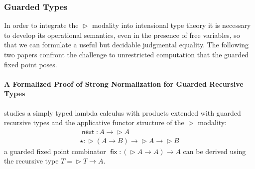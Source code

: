 \documentclass{book}
\DeclareMathOperator{\fix}{\mathsf{fix}}
\DeclareMathOperator{\Later}{\vartriangleright}
\DeclareMathOperator{\next}{\ensuremath{\mathsf{next}}}
\begin{document}

\subsubsection{Guarded Types}

In order to integrate the $\Later$ modality into intensional type
theory it is necessary to develop its operational semantics, even in
the presence of free variables, so that we can formulate a useful but
decidable judgmental equality. The following two papers confront the
challenge to unrestricted computation that the guarded fixed point
poses.

  \paragraph{A Formalized Proof of Strong Normalization for Guarded Recursive Types}
  studies a simply typed lambda calculus with products extended with guarded
  recursive types and the applicative functor structure of the $\Later$
  modality:
  \[
  \begin{array}{l}
  \next : A \to \Later A \\
  \star : \Later (A \to B) \to \Later A \to \Later B
  \end{array}
  \]
  a guarded fixed point combinator $\fix : (\Later A \to A) \to
  A$ can be derived using the recursive type $T = \Later T \to A$.
\end{document}
